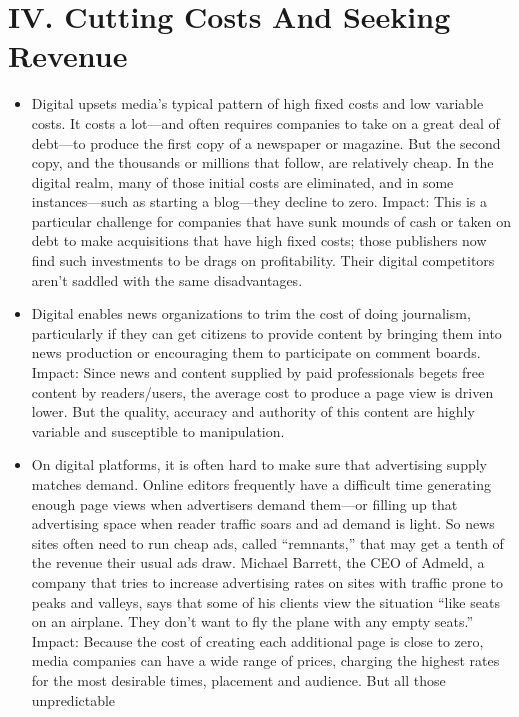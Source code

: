 \section{IV. Cutting Costs And Seeking Revenue}
\begin{itemize}
\item Digital upsets media's typical pattern of high fixed costs and low variable
costs. It costs a lot—and often requires companies to take on a great
deal of debt—to produce the first copy of a newspaper or magazine. But the
second copy, and the thousands or millions that follow, are relatively cheap.
In the digital realm, many of those initial costs are eliminated, and in some
instances—such as starting a blog—they decline to zero.
Impact: This is a particular challenge for companies that have sunk mounds
of cash or taken on debt to make acquisitions that have high fixed costs;
those publishers now find such investments to be drags on profitability. Their
digital competitors aren't saddled with the same disadvantages.
\item Digital enables news organizations to trim the cost of doing journalism,
particularly if they can get citizens to provide content by bringing them into
news production or encouraging them to participate on comment boards.
Impact: Since news and content supplied by paid professionals begets free
content by readers/users, the average cost to produce a page view is driven
lower. But the quality, accuracy and authority of this content are highly variable
and susceptible to manipulation.
\item On digital platforms, it is often hard to make sure that advertising supply
matches demand. Online editors frequently have a difficult time generating
enough page views when advertisers demand them—or filling up that
advertising space when reader traffic soars and ad demand is light. So news
sites often need to run cheap ads, called ``remnants,'' that may get a tenth of
the revenue their usual ads draw. Michael Barrett, the CEO of Admeld, a
company that tries to increase advertising rates on sites with traffic prone to
peaks and valleys, says that some of his clients view the situation ``like seats
on an airplane. They don't want to fly the plane with any empty seats.''
Impact: Because the cost of creating each additional page is close to zero,
media companies can have a wide range of prices, charging the highest rates
for the most desirable times, placement and audience. But all those unpredictable

\end{itemize}
